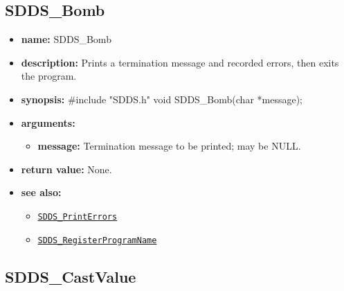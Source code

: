 \documentclass[11pt]{article}
\newcommand{\progref}[1]{\hyperref[SDDS_#1]{\tt SDDS\_#1}}
\begin{document}
\subsection{SDDS\_Bomb}
\label{SDDS_Bomb}

\begin{itemize}
\item {\bf name:}\newline
SDDS\_Bomb
\item {\bf description:}\newline
Prints a termination message and recorded errors, then exits the program.
\item {\bf synopsis:} \#include "SDDS.h"\newline
void SDDS\_Bomb(char *message);
\item {\bf arguments:}
\begin{itemize}
\item {\bf message:} Termination message to be printed; may be NULL.
\end{itemize}
\item {\bf return value:}\newline
None.
\item {\bf see also:}
\begin{itemize}
\item \progref{PrintErrors}
\item \progref{RegisterProgramName}
\end{itemize}
\end{itemize}

\subsection{SDDS\_CastValue}
\label{SDDS_CastValue}
\end{document}
